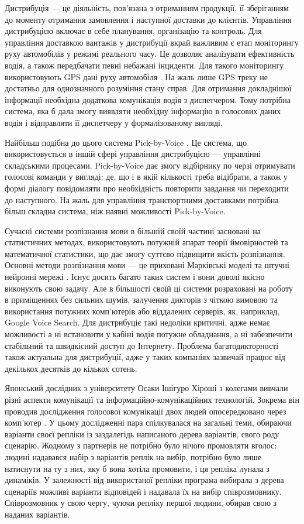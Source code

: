 Дистрибуція — це діяльність, пов'язана з отриманням продукції, її зберіганням до моменту отримання замовлення і наступної доставки до клієнтів. Управління дистрибуцією включає в себе планування, організацію та контроль. Для управління доставкою вантажів у дистрибуції вкрай важливим є етап моніторингу руху автомобілів у режимі реального часу. Це дозволяє аналізувати ефективність водія, а також передбачати певні небажані інциденти. Для такого моніторингу використовують GPS дані руху автомобіля \cite{Gonzalez_2013}. На жаль лише GPS треку не достатньо для однозначного розуміння стану справ. Для отримання докладнішої інформації необхідна додаткова комунікація водія з диспетчером. Тому потрібна система, яка б дала змогу виявляти необхідну інформацію в голосових даних водія і відправляти її диспетчеру у формалізованому вигляді.

Найбільш подібна до цього система Pick-by-Voice \cite{Pick-to-Voice}. Це система, що використовується в іншій сфері управління дистрибуцією — управлінні складськими процесами. Pick-by-Voice дає змогу відбірнику по черзі отримувати голосові команди у вигляді: де, що і в якій кількості треба відібрати, а також у формі діалогу повідомляти про необхідність повторити завдання чи переходити до наступного. На жаль для управління транспортними доставками потрібна більш складна система, ніж наявні можливості Pick-by-Voice.

Сучасні системи розпізнання мови в більшій своїй частині засновані на статистичних методах, використовують потужній апарат теорії ймовірностей та математичної статистики, що дає змогу суттєво підвищити якість розпізнання. Основні методи розпізнання мови — це приховані Марківські моделі та штучні нейронні мережі \cite{Makovkin_2006}. Існує досить багато таких систем і вони доволі якісно виконують свою задачу. Але в більшості своїй ці системи розраховані на роботу в приміщеннях без сильних шумів, залучення дикторів з чіткою вимовою та використання потужних комп’ютерів або віддалених серверів, як, наприклад, Google Voice Search. Для дистрибуціє такі недоліки критичні, адже немає можливості а ні встановити у кабіні водія потужне обладнання, а ні забезпечити стабільний та швидкісний доступ до Інтернету. Проблема багатодикторності також актуальна для дистрибуції, адже у таких компаніях зазвичай працює від декількох десятків до кількох сотень. 

Японський дослідник з університету Осаки Ішігуро Хіроші з колегами вивчали різні аспекти комунікації та інформаційно-комунікаційних технологій. Зокрема він проводив дослідження голосової комунікації двох людей опосередковано через комп’ютер \cite{Ishiguro_2016}. У цьому дослідженні пара спілкувалася на загальні теми, обираючи варіанти своєї репліки із заздалегідь написаного дерева варіантів, свого роду сценарію. Жодному з партнерів не потрібно було нічого промовляти вголос: людині надавався набір з варіантів реплік на вибір, потрібно було лише натиснути на ту з них, яку б вона хотіла промовити, і ця репліка лунала з динаміків. У залежності від використаної репліки програма вибирала з дерева сценаріїв можливі варіанти відповідей і надавала їх на вибір співрозмовнику. Співрозмовник у свою чергу, чуючи репліку першої людини, обирав свою з наданих варіантів.

